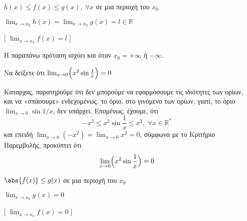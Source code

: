 \begin{prop}[\textcolor{Col1}{Κριτήριο Παρεμβολής}]
\item {}
  \begin{minipage}[t]{8.0 cm}
    \begin{myitemize}
      \item $ h(x) \leq f(x) \leq g(x), \; \forall x$ σε μια περιοχή του $ x_{0} $
        \hfill{}
      \item $ \lim_{x \to x_{0}} h(x) = \lim_{x \to x_{0}} g(x) = l \in \mathbb{R} $
        \hfill{}
    \end{myitemize}
  \end{minipage}
  [ $ \lim_{x \to x_{0}} f(x) = l $ ]
\end{prop}

\begin{rem}
  Η παραπάνω πρόταση ισχύει και όταν $ x_{0} = + \infty $ ή $ - \infty $.
\end{rem}

\begin{example}
  Να δείξετε ότι $ \lim_{x \to 0} \Bigl(x^{2} \sin{\frac{1}{x}}\Bigr) = 0  $ 
\end{example}
\begin{solution}
  Καταρχας, παρατηρούμε ότι δεν μπορούμε να εφαρμόσουμε τις ιδιότητες των ορίων, και να 
  «σπάσουμε» ενδεχομένως, το όριο, στο γινόμενο των ορίων, γιατί, το όριο 
  $ \lim_{x \to 0} \sin{1/x} $, δεν υπάρχει.
  Επομένως, έχουμε, ότι
  \[
    - x^{2} \leq x^{2} \sin{\frac{1}{x}} \leq x^{2}, \; \forall x \in \mathbb{R}^{*}
  \]
  και επειδή $ \lim_{x \to 0} (-x^{2}) = \lim_{x \to 0} x^{2} = 0 $, σύμφωνα με το 
  Κριτήριο Παρεμβολής, προκύπτει ότι 
  \[
    \lim_{x \to 0} \Bigl(x^{2} \sin{\frac{1}{x}}\Bigr)  = 0
  \]
\end{solution}

\begin{cor}
\item {}
  \begin{minipage}[t]{6.5 cm}
    \begin{myitemize}
      \item $ \abs{f(x)} \leq g(x) $ σε μια περιοχή του $ x_{0} $
        \hfill{}
      \item $ \lim_{x \to x_{0}} g(x) = 0 $
        \hfill{}
    \end{myitemize}
  \end{minipage}
  [ $ \lim_{x \to x_{0}} f(x) = 0 $ ]
\end{cor}

